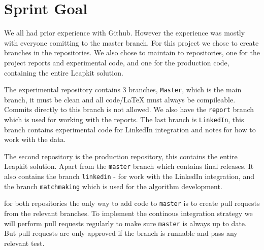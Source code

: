\section{Sprint Goal}

We all had prior experience with Github. However the experience was
mostly with everyone comitting to the master branch. For this project we
chose to create branches in the repositories. We also chose to maintain to
repositories, one for the project reports and experimental code, and one
for the production code, containing the entire Leapkit solution.

The experimental repository contains 3 branches, \texttt{Master}, which
is the main branch, it must be clean and all code/LaTeX must always be
compileable. Commits directly to this branch is not allowed. We also have
the \texttt{report} branch which is used for working with the reports. The
last branch is \texttt{LinkedIn}, this branch contains experimental code
for LinkedIn integration and notes for how to work with the data.

The second repository is the production repository, this contains
the entire Leapkit solution. Apart from the \texttt{master}
branch which contains final releases. It also contains the branch
\texttt{linkedin} - for work with the LinkedIn integration, and the branch
\texttt{matchmaking} which is used for the algorithm development.

for both repositories the only way to add code to \texttt{master} is
to create pull requests from the relevant branches. To implement the
continous integration strategy we will perform pull requests regularly
to make sure \texttt{master} is always up to date. But pull requests are
only approved if the branch is runnable and pass any relevant test. 
